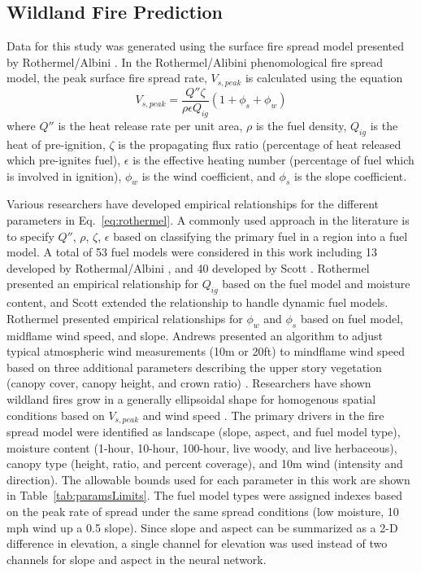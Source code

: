 \documentclass[smallcondensed]{svjour3}     %
\begin{document}
\subsection{Wildland Fire Prediction}
\label{ss:Wfp}

Data for this study was generated using the surface fire spread model
presented by Rothermel/Albini
\cite{rothermel1972mathematical,scott2005standard,albini1976estimating}.
In the Rothermel/Alibini phenomological fire spread model, the peak
surface fire spread rate, $V_{s,peak}$ is calculated using the equation
\begin{equation}
V_{s,peak} = \frac{Q''\zeta}{\rho\epsilon Q_{ig}}\left(1+\phi_{s}+\phi_{w}\right)
\label{eq:rothermel}
\end{equation}
where $Q''$ is the heat release rate per unit area, $\rho$ is the
fuel density, $Q_{ig}$ is the heat of pre-ignition, $\zeta$ is the
propagating flux ratio (percentage of heat released which pre-ignites
fuel), $\epsilon$ is the effective heating number (percentage of fuel
which is involved in ignition), $\phi_{w}$ is the wind coefficient,
and $\phi_{s}$ is the slope coefficient.

Various researchers have developed empirical relationships for the
different parameters in Eq.~\ref{eq:rothermel}. A commonly used approach
in the literature is to specify $Q''$, $\rho$, $\zeta$, $\epsilon$
based on classifying the primary fuel in a region into a fuel model.
A total of 53 fuel models were considered in this work including
13 developed by Rothermal/Albini \cite{rothermel1972mathematical,albini1976estimating},
and 40 developed by Scott \cite{scott2005standard}. Rothermel presented
an empirical relationship for $Q_{ig}$ based on the fuel model and
moisture content, and Scott extended the relationship to handle dynamic
fuel models. Rothermel presented empirical relationships for $\phi_{w}$
and $\phi_{s}$ based on fuel model, midflame wind speed, and slope.
Andrews presented an algorithm to adjust typical atmospheric wind
measurements (10m or 20ft) to mindflame wind speed based on three
additional parameters describing the upper story vegetation
(canopy cover, canopy height, and crown ratio)
\cite{andrews2012modeling}. Researchers have shown wildland fires grow
in a generally ellipsoidal shape for homogenous spatial conditions
based on $V_{s,peak}$ and wind speed
\cite{finney1999mechanistic,wagner1969simple,green1983fire}.
The primary drivers in the fire spread model were identified as
landscape (slope, aspect, and fuel model type),
moisture content (1-hour, 10-hour, 100-hour, live woody, and live herbaceous),
canopy type (height, ratio, and percent coverage),
and 10m wind (intensity and direction). The allowable bounds used for
each parameter in this work are shown in Table~\ref{tab:paramsLimits}.
The fuel model types were assigned indexes based on the peak rate of spread
under the same spread conditions (low moisture, 10 mph wind up a 0.5 slope).
Since slope and aspect can be summarized as a 2-D difference in elevation,
a single channel for elevation was used instead of two channels for slope
and aspect in the neural network.
\end{document}
